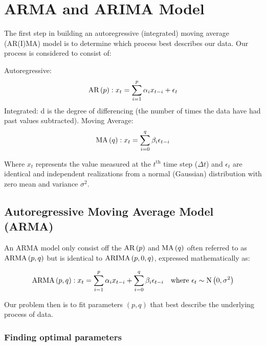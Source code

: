 \section{ARMA and ARIMA Model}

The first step in building an autoregressive (integrated) moving average (AR(I)MA) model is to determine which process best describes our data. Our process is considered to consist of:

\begin{multicols}{3}
    Autoregressive:
    \begin{equation*}
        \text{AR}\left(p\right): x_t = \sum_{i=1}^p\alpha_ix_{t-i} + \epsilon_t
    \end{equation*}
    \vfill
    \columnbreak
    \noindent Integrated: d is the degree of differencing (the number of times the data have had past values subtracted).
    \vfill
    \columnbreak
    Moving Average:
    \begin{equation*}
        \text{MA}\left(q\right): x_t = \sum_{i=0}^q\beta_i\epsilon_{t-i}
    \end{equation*}
    \vfill
    \columnbreak
\end{multicols}

Where $x_t$ represents the value measured at the $t^{\text{th}}$ time step ($\Delta t$) and $\epsilon_t$ are identical and independent realizations from a normal (Gaussian) distribution with zero mean and variance $\sigma^2$. 

\subsection{Autoregressive Moving Average Model (ARMA)}

An ARMA model only consist off the $\text{AR}\left(p\right)$ and $\text{MA}\left(q\right)$ often referred to as $\text{ARMA}\left(p,q\right)$ but is identical to \break$\text{ARIMA}\left(p,0,q\right)$, expressed mathematically as:

\begin{equation*}
   \text{ARMA}\left(p,q\right) : x_t  = \sum_{i=1}^p\alpha_ix_{t-i} + \sum_{i=0}^q\beta_i\epsilon_{t-i} \quad \text{where } \epsilon_t \sim \text{N}\left(0, \sigma^2\right)
\end{equation*}

Our problem then is to fit parameters $(p,q)$ that best describe the underlying process of data.

\subsubsection{Finding optimal parameters}

